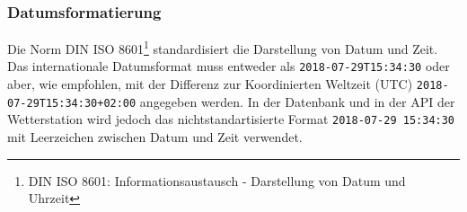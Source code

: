 





\subsubsection{Datumsformatierung}
\label{kap:dateformat}
Die Norm DIN ISO 8601\footnote{DIN ISO 8601: Informationsaustausch - Darstellung von Datum und Uhrzeit} standardisiert die Darstellung von Datum und Zeit. Das internationale Datumsformat muss entweder als \texttt{2018-07-29T15:34:30} oder aber, wie empfohlen, mit der Differenz zur Koordinierten Weltzeit (UTC) \texttt{2018-07-29T15:34:30+02:00} angegeben werden. In der Datenbank und in der API der Wetterstation wird jedoch das nichtstandartisierte Format \texttt{2018-07-29 15:34:30} mit Leerzeichen zwischen Datum und Zeit verwendet.



\noindent
{} \newline
{} \newline
{} \newline


